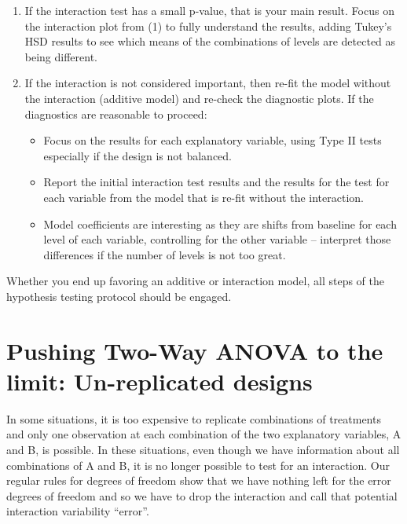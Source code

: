 \documentclass[]{book}
\theoremstyle{definition}
\theoremstyle{definition}
\theoremstyle{remark}
\begin{document}
\newpage

\begin{enumerate}
\def\labelenumi{\arabic{enumi}.}
\setcounter{enumi}{3}
\item
  If the interaction test has a small p-value, that is your main result.
  Focus on the interaction plot from (1) to fully understand the
  results, adding Tukey's HSD results to see which means of the
  combinations of levels are detected as being different.
\item
  If the interaction is not considered important, then re-fit the model
  without the interaction (additive model) and re-check the diagnostic
  plots. If the diagnostics are reasonable to proceed:

  \begin{itemize}
  \item
    Focus on the results for each explanatory variable, using Type II
    tests especially if the design is not balanced.
  \item
    Report the initial interaction test results and the results for the
    test for each variable from the model that is re-fit without the
    interaction.
  \item
    Model coefficients are interesting as they are shifts from baseline
    for each level of each variable, controlling for the other variable
    -- interpret those differences if the number of levels is not too
    great.
  \end{itemize}
\end{enumerate}

Whether you end up favoring an additive or interaction model, all steps
of the hypothesis testing protocol should be engaged.

\section{Pushing Two-Way ANOVA to the limit: Un-replicated
designs}\label{section4-6}

In some situations, it is too expensive to replicate combinations of
treatments and only one observation at each combination of the two
explanatory variables, A and B, is possible. In these situations, even
though we have information about all combinations of A and B, it is no
longer possible to test for an interaction. Our regular rules for
degrees of freedom show that we have nothing left for the error degrees
of freedom and so we have to drop the interaction and call that
potential interaction variability ``error''.
\end{document}
